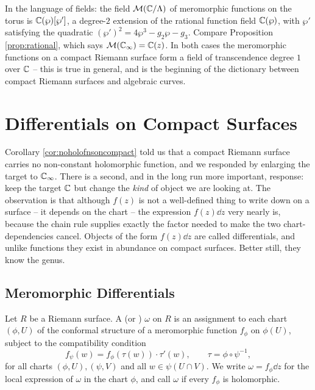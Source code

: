 \documentclass[a4paper]{scrartcl}
\newcommand{\Cinf}{\C_\infty}
\begin{document}
In the language of fields: the field $\mathcal{M}(\mathbb{C}/\Lambda)$ of meromorphic functions on
the torus is $\mathbb{C}(\wp)[\wp']$, a degree-$2$ extension of the rational function field
$\mathbb{C}(\wp)$, with $\wp'$ satisfying the quadratic $(\wp')^2 = 4\wp^3-g_2\wp-g_3$. Compare
Proposition \ref{prop:rational}, which says $\mathcal{M}(\Cinf) = \C(z)$. In both cases
the meromorphic functions on a compact Riemann surface form a field of transcendence
degree $1$ over $\mathbb{C}$ -- this is true in general, and is the beginning of the dictionary
between compact Riemann surfaces and algebraic curves.

\section{Differentials on Compact Surfaces}\label{rs-sec:differentials}

Corollary \ref{cor:noholofnsoncompact} told us that a compact Riemann surface carries no
non-constant holomorphic function, and we responded by enlarging the target to $\Cinf$.
There is a second, and in the long run more important, response: keep the target $\mathbb{C}$ but
change the \emph{kind} of object we are looking at. The observation is that although
$f(z)$ is not a well-defined thing to write down on a surface -- it depends on the chart
-- the expression $f(z)\dd z$ very nearly is, because the chain rule supplies exactly the
factor needed to make the two chart-dependencies cancel. Objects of the form $f(z)\dd z$
are called differentials, and unlike functions they exist in abundance on compact
surfaces. Better still, they know the genus.

\subsection{Meromorphic Differentials}

\begin{definition}
	Let $R$ be a Riemann surface. A  (or
	) $\omega$ on $R$ is an assignment to each chart
	$(\phi, U)$ of the conformal structure of a meromorphic function $f_\phi$ on
	$\phi(U)$, subject to the compatibility condition
	$$
	f_\psi(w) = f_\phi\left(\tau(w)\right)\cdot\tau'(w), \qquad
	\tau = \phi\circ\psi^{-1},
	$$
	for all charts $(\phi,U), (\psi,V)$ and all $w \in \psi(U\cap V)$. We write
	$\omega = f_\phi \dd z$ for the local expression of $\omega$ in the chart $\phi$, and
	call $\omega$  if every $f_\phi$ is holomorphic.
\end{definition}
\end{document}
